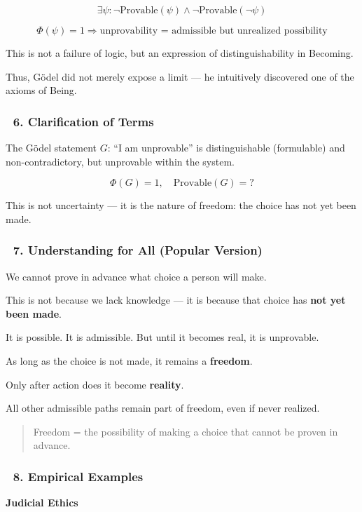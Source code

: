 \documentclass[12pt]{article}
\begin{document}
\[
\exists \psi : \neg \mathrm{Provable}(\psi) \land \neg \mathrm{Provable}(\neg \psi)
\]

\[
\Phi(\psi) = 1 \Rightarrow \text{unprovability = admissible but unrealized possibility}
\]

This is not a failure of logic, but an expression of distinguishability in Becoming.

Thus, Gödel did not merely expose a limit — he intuitively discovered one of the axioms of Being.

\subsubsection*{🔹 6. Clarification of Terms}

The Gödel statement $G$: ``I am unprovable'' is distinguishable (formulable) and non-contradictory, but unprovable within the system.

\[
\Phi(G) = 1, \quad \mathrm{Provable}(G) = ?
\]

This is not uncertainty — it is the nature of freedom: the choice has not yet been made.

\subsubsection*{🔹 7. Understanding for All (Popular Version)}

We cannot prove in advance what choice a person will make.

This is not because we lack knowledge — it is because that choice has \textbf{not yet been made}.

It is possible. It is admissible. But until it becomes real, it is unprovable.

As long as the choice is not made, it remains a \textbf{freedom}.

Only after action does it become \textbf{reality}.

All other admissible paths remain part of freedom, even if never realized.

\begin{quote}
Freedom = the possibility of making a choice that cannot be proven in advance.
\end{quote}

\subsubsection*{🔹 8. Empirical Examples}

\textbf{Judicial Ethics}
\end{document}
